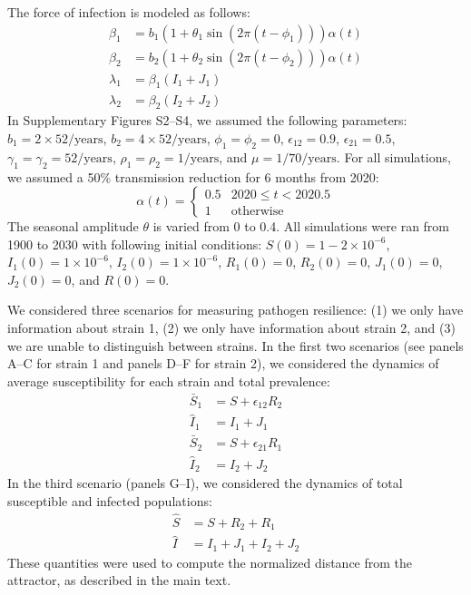 \documentclass[12pt]{article}
\begin{document}
The force of infection is modeled as follows:
\begin{align}
\beta_1 &= b_1 (1 + \theta_1 \sin(2 \pi (t-\phi_1))) \alpha(t)\\
\beta_2 &= b_2 (1 + \theta_2 \sin(2 \pi (t-\phi_2))) \alpha(t)\\
\lambda_1 &= \beta_1 (I_1 + J_1)\\
\lambda_2 &= \beta_2 (I_2 + J_2)
\end{align}
In Supplementary Figures S2--S4, we assumed the following parameters:
$b_1 = 2 \times 52/\mathrm{years}$, $b_2 = 4 \times 52/\mathrm{years}$, $\phi_1 = \phi_2 = 0$, $\epsilon_{12} = 0.9$, $\epsilon_{21} = 0.5$,
$\gamma_1 = \gamma_2 = 52/\mathrm{years}$, $\rho_1 = \rho_2 = 1/\mathrm{years}$, and $\mu=1/70/\mathrm{years}$.
For all simulations, we assumed a 50\% transmission reduction for 6 months from 2020:
\begin{equation}
\alpha(t) = \begin{cases}
0.5 & 2020 \leq t< 2020.5\\
1 & \textrm{otherwise}
\end{cases}
\end{equation}
The seasonal amplitude $\theta$ is varied from 0 to 0.4.
All simulations were ran from 1900 to 2030 with following initial conditions: 
$S(0) = 1 - 2\times 10^{-6}$, $I_1(0) = 1 \times 10^{-6}$, $I_2(0) = 1 \times 10^{-6}$, $R_1(0) = 0$, $R_2(0) = 0$, $J_1(0) = 0$, $J_2(0) = 0$, and $R(0) = 0$.

We considered three scenarios for measuring pathogen resilience: (1) we only have information about strain 1, (2) we only have information about strain 2, and (3) we are unable to distinguish between strains.
In the first two scenarios (see panels A--C for strain 1 and panels D--F for strain 2), we considered the dynamics of average susceptibility for each strain and total prevalence:
\begin{align}
\bar{S}_1 &= S + \epsilon_{12} R_2\\
\hat{I}_1 &= I_1 + J_1\\
\bar{S}_2 &= S + \epsilon_{21} R_1\\
\hat{I}_2 &= I_2 + J_2
\end{align}
In the third scenario (panels G--I), we considered the dynamics of total susceptible and infected populations:
\begin{align}
\hat{S} &= S + R_2 + R_1\\
\hat{I} &= I_1 + J_1 + I_2 + J_2
\end{align}
These quantities were used to compute the normalized distance from the attractor, as described in the main text.
\end{document}
